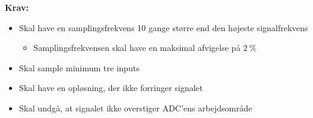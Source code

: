 \vspace{3mm}
\textbf{Krav:}
\begin{itemize}
\item Skal have en samplingsfrekvens 10 gange større end den højeste signalfrekvens
\begin{itemize}
\item Samplingsfrekvensen skal have en maksimal afvigelse på $2~\%$
\end{itemize}
\item Skal sample minimum tre inputs 
\item Skal have en opløsning, der ikke forringer signalet
\item Skal undgå, at signalet ikke overstiger ADC'ens arbejdsområde


\end{itemize}

